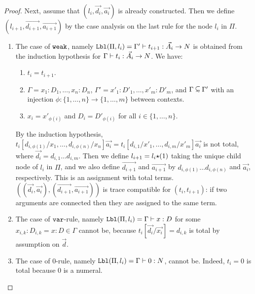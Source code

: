 \begin{proof}
  Next, assume that $(l_i,\vec{d_i},\vec{a_i})$ is already constructed.
  Then we define $(l_{i+1},\vec{d_{i+1}},\vec{a_{i+1}})$ by the case analysis on
  the last rule for the node $l_i$ in $\Pi$. 




\begin{enumerate}

\item
  The case of ${\tt weak}$, namely
  ${\tt Lbl}(\Pi,l_i) = \Gamma'\vdash t_{i+1}:\vec{A_i}\rightarrow{N}$
  is obtained from the induction hypothesis for
  $\Gamma\vdash t_{i}:\vec{A_i}\rightarrow{N}$. We have:

\begin{enumerate}
\item
 $t_i = t_{i+1}$. 
\item
  $\Gamma = x_1:D_1,\ldots,x_n:D_n$, $\Gamma' = x'_1:D'_1,\ldots,x'_m:D'_m$, and $\Gamma \subseteqsim \Gamma'$
  with an injection $\phi:\{1,\ldots,n\}\to\{1,\ldots,m\}$ between contexts. 
\item
  $x_i = x'_{\phi(i)}$ and $D_i = D'_{\phi(i)}$ for all $i \in \{1,\ldots,n\}$.
\end{enumerate}

  By the induction hypothesis, 
  $t_i[d_{i,\phi(1)}/x_1,\ldots,d_{i,\phi(n)}/x_n]\vec{a_i} 
   = t_i[d_{i,1}/x'_1,\ldots,d_{i,m}/x'_m]\vec{a_i}$ is not total,
  where $\vec{d_i} = d_{i,1}\ldots d_{i,m}$.
  Then we define $l_{i+1} = l_i{\star}(1)$ taking the unique child node of $l_i$ in $\Pi$, and we
  also define $\vec{d_{i+1}}$ and $\vec{a_{i+1}}$ by $d_{i,\phi(1)}\ldots d_{i,\phi(n)}$
  and $\vec{a_i}$, respectively. This is an assignment with total terms.
  $((\vec{d_i},\vec{a_i}),(\vec{d_{i+1}},\vec{a_{i+1}}))$
  is trace compatible for $(t_i,t_{i+1})$: if two arguments are connected then they are assigned
  to the same term. 

\item
  The case of ${\tt var}$-rule, namely ${\tt Lbl}(\Pi,l_i) = \Gamma\vdash x:D$ 
  for some $x_{i,k}:D_{i,k} = x:D \in \Gamma$
  cannot be, because $t_i [\vec{d_i}/\vec{x_i}] = d_{i,k}$ is total  by assumption on $\vec{d}$.
  
\item
  The case of $0$-rule, namely ${\tt Lbl}(\Pi,l_i) = \Gamma\vdash 0:{N}$, 
  cannot be. Indeed, $t_i = 0$ is total because $0$ is a numeral.


\end{enumerate}
\end{proof}
